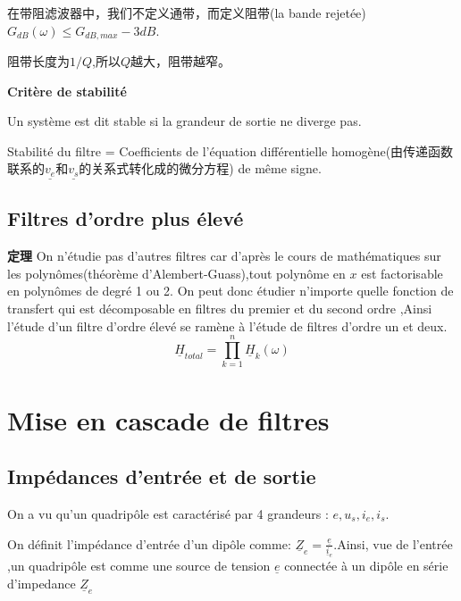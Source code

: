 \documentclass[12pt]{book}
\theoremstyle{definition}\newtheorem{dfn}{Définition}[chapter]
\theoremstyle{plain}\newtheorem{thm}{Théorème}[chapter]
\theoremstyle{plain}\newtheorem{prp}{Proposition}[chapter]
\theoremstyle{plain}\newtheorem{lem}{\bf Lemme}[chapter]
\theoremstyle{plain}\newtheorem{axm}{\bf Axiome}[chapter]
\theoremstyle{plain}\newtheorem{lmm}{\bf Lemme}[chapter]
\theoremstyle{plain}\newtheorem{cor}{\bf Corollaire}[chapter]
\theoremstyle{remark}\newtheorem{rem}{Remarque}[chapter]
\begin{document}
\begin{framed}
	在带阻滤波器中，我们不定义通带，而定义阻带(la bande rejetée) $G_{dB}(\omega)\le G_{dB,max}-3dB$.
	
	阻带长度为$1/Q$,所以$Q$越大，阻带越窄。
\end{framed}	
\begin{framed}{\textbf{Critère de stabilité}}
	
	Un système est dit stable si la grandeur de sortie ne diverge pas.	
	
	Stabilité du filtre = Coefficients de l'équation différentielle homogène(由传递函数联系的$\underline{v_e}$和$\underline{v_s}$的关系式转化成的微分方程) de {\color{red}même signe}.
	
\end{framed}

\subsection{Filtres d'ordre plus élevé}
\begin{framed}{\textbf{定理}}
On n'étudie pas d'autres filtres car d'après le cours de mathématiques sur les polynômes(théorème d'Alembert-Guass),tout polynôme en $x$ est factorisable en polynômes de degré 1 ou 2. On peut donc étudier n'importe quelle fonction de transfert qui est décomposable en filtres du premier et du second ordre ,Ainsi l'étude d'un filtre d'ordre élevé se ramène à l'étude de filtres d'ordre un et deux.
$$
\underline{H}_{total}=\prod_{k=1}^{n}\underline{H}_k(\omega)
$$ 
\end{framed}
\section{Mise en cascade de filtres}
\subsection{Impédances d'entrée et de sortie}
On a vu qu'un quadripôle est caractérisé par 4 grandeurs : $e,u_s,i_e,i_s$.

On définit l'impédance d'entrée d'un dipôle comme:
$\underline{Z}_e=\frac{\underline{e}}{\underline{i}_e}$.Ainsi, vue de l'entrée ,un quadripôle est comme une source de tension $\underline{e}$ connectée à un dipôle en série d'impedance $\underline{Z}_e$
\end{document}
